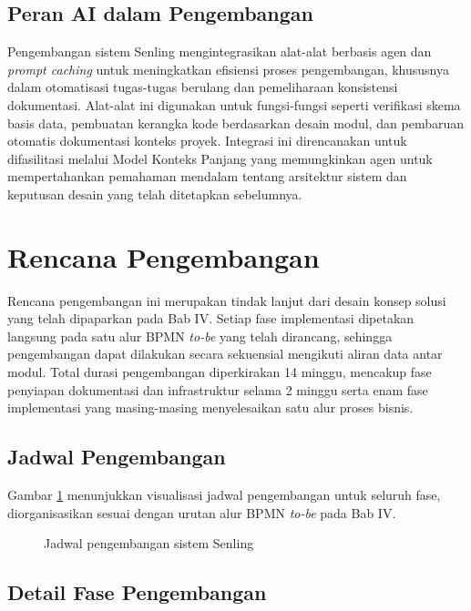 \subsection{Peran AI dalam Pengembangan}

Pengembangan sistem Senling mengintegrasikan alat-alat berbasis agen dan \textit{prompt caching} untuk meningkatkan efisiensi proses pengembangan, khususnya dalam otomatisasi tugas-tugas berulang dan pemeliharaan konsistensi dokumentasi. Alat-alat ini digunakan untuk fungsi-fungsi seperti verifikasi skema basis data, pembuatan kerangka kode berdasarkan desain modul, dan pembaruan otomatis dokumentasi konteks proyek. Integrasi ini direncanakan untuk difasilitasi melalui Model Konteks Panjang yang memungkinkan agen untuk mempertahankan pemahaman mendalam tentang arsitektur sistem dan keputusan desain yang telah ditetapkan sebelumnya.

\section{Rencana Pengembangan}

Rencana pengembangan ini merupakan tindak lanjut dari desain konsep solusi yang telah dipaparkan pada Bab IV. Setiap fase implementasi dipetakan langsung pada satu alur BPMN \textit{to-be} yang telah dirancang, sehingga pengembangan dapat dilakukan secara sekuensial mengikuti aliran data antar modul. Total durasi pengembangan diperkirakan 14 minggu, mencakup fase penyiapan dokumentasi dan infrastruktur selama 2 minggu serta enam fase implementasi yang masing-masing menyelesaikan satu alur proses bisnis.

\subsection{Jadwal Pengembangan}

Gambar \ref{tab:gantt-chart} menunjukkan visualisasi jadwal pengembangan untuk seluruh fase, diorganisasikan sesuai dengan urutan alur BPMN \textit{to-be} pada Bab IV.

\begin{figure}[htbp]
\centering

\caption{Jadwal pengembangan sistem Senling}
\label{tab:gantt-chart}
\end{figure}

\subsection{Detail Fase Pengembangan}

